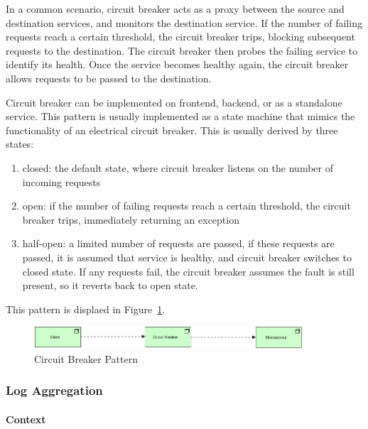 \documentclass{bmcart}
\begin{document}
In a common scenario, circuit breaker acts as a proxy between the source and destination services, and monitors the destination service. If the number of failing requests reach a certain threshold, the circuit breaker trips, blocking subsequent requests to the destination. The circuit breaker then probes the failing service to identify its health. Once the service becomes healthy again, the circuit breaker allows requests to be passed to the destination. 

Circuit breaker can be implemented on frontend, backend, or as a standalone service. This pattern is usually implemented as a state machine that mimics the functionality of an electrical circuit breaker. This is usually derived by three states: 

\begin{enumerate}
  \item closed: the default state, where circuit breaker listens on the number of incoming requests
  \item open: if the number of failing requests reach a certain threshold, the circuit breaker trips, immediately returning an exception
  \item half-open: a limited number of requests are passed, if these requests are passed, it is assumed that service is healthy, and circuit breaker switches to closed state. If any requests fail, the circuit breaker assumes the fault is still present, so it reverts back to open state.
\end{enumerate}

This pattern is displaed in Figure~\ref{circuitBreaker}.

\begin{figure}[h]
  \includegraphics[width=10cm]{Media/Circuit Breaker.jpg}
  \caption{Circuit Breaker Pattern}
  \label{circuitBreaker}
\end{figure}

\subsubsection{Log Aggregation}



\paragraph{Context}
\end{document}
